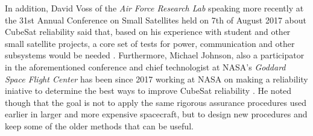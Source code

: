 \documentclass[english,12pt,a4paper,pdftex,elec,utf8]{aaltothesis}
\begin{document}
In addition, David Voss of the \textit{Air Force Research Lab} speaking more recently at the 31st Annual Conference on Small Satellites held on 7th of August 2017 about CubeSat reliability said that, based on his experience with student and other small satellite projects, a core set of tests for power, communication and other subsystems would be needed \cite{smallsatconf31}. Furthermore, Michael Johnson, also a participator in the aforementioned conference and chief technologist at NASA's \textit{Goddard Space Flight Center} has been since 2017 working at NASA on making a reliability iniative to determine the best ways to improve CubeSat reliability \cite{smallsatconf31, ssvi}. He noted though that the goal is not to apply the same rigorous assurance procedures used earlier in larger and more expensive spacecraft, but to design new procedures and keep some of the older methods that can be useful. \par 
\end{document}
